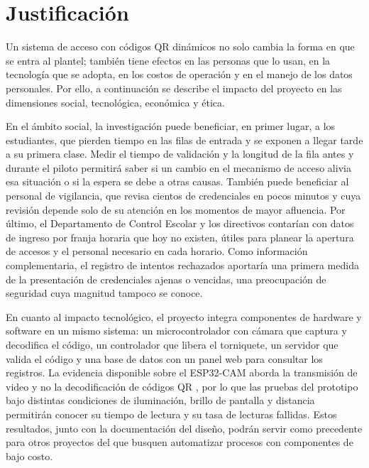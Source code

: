 \section{Justificación}
Un sistema de acceso con códigos QR dinámicos no solo cambia la forma en que
se entra al plantel; también tiene efectos en las personas que lo usan, en la
tecnología que se adopta, en los costos de operación y en el manejo de los
datos personales. Por ello, a continuación se describe el impacto del
proyecto en las dimensiones social, tecnológica, económica y ética.

En el ámbito social, la investigación puede beneficiar, en primer lugar, a
los estudiantes, que pierden tiempo en las filas de entrada y se exponen a
llegar tarde a su primera clase. Medir el tiempo de validación y la longitud
de la fila antes y durante el piloto permitirá saber si un cambio en el
mecanismo de acceso alivia esa situación o si la espera se debe a otras
causas. También puede beneficiar al personal de vigilancia, que revisa
cientos de credenciales en pocos minutos y cuya revisión depende solo de su
atención en los momentos de mayor afluencia. Por último, el Departamento de
Control Escolar y los directivos contarían con datos de ingreso por franja
horaria que hoy no existen, útiles para planear la apertura de accesos y el
personal necesario en cada horario. Como información complementaria, el
registro de intentos rechazados aportaría una primera medida de la
presentación de credenciales ajenas o vencidas, una preocupación de
seguridad cuya magnitud tampoco se conoce.

En cuanto al impacto tecnológico, el proyecto integra componentes de
hardware y software en un mismo sistema: un microcontrolador con cámara que
captura y decodifica el código, un controlador que libera el torniquete, un
servidor que valida el código y una base de datos con un panel web para
consultar los registros. La evidencia disponible sobre el ESP32-CAM aborda la
transmisión de video y no la decodificación de códigos QR
\parencite{nowroz2025esp32cam}, por lo que las pruebas del prototipo bajo
distintas condiciones de iluminación, brillo de pantalla y distancia
permitirán conocer su tiempo de lectura y su tasa de lecturas fallidas.
Estos resultados, junto con la documentación del diseño, podrán servir como
precedente para otros proyectos del \tescha{} que busquen automatizar
procesos con componentes de bajo costo.

